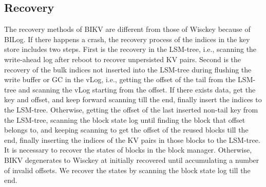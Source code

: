 \documentclass[sigconf]{acmart}
\begin{document}
\subsection{Recovery} \label{ss4}
%
The recovery methods of BIKV are different from those of Wisckey because of BILog. If there happens a crash, the recovery process of the indices in the key store includes two steps. First is the recovery in the LSM-tree, i.e., scanning the write-ahead log after reboot to recover unpersisted KV pairs. Second is the recovery of the bulk indices not inserted into the LSM-tree during flushing the write buffer or GC in the vLog, i.e., getting the offset of the tail from the LSM-tree and scanning the vLog starting from the offset. If there exists data, get the key and offset, and keep forward scanning till the end, finally insert the indices to the LSM-tree. Otherwise, getting the offset of the last inserted non-tail key from the LSM-tree, scanning the block state log until finding the block that offset belongs to, and keeping scanning to get the offset of the reused blocks till the end, finally inserting the indices of the KV pairs in those blocks to the LSM-tree. It is necessary to recover the states of blocks in the block manager. Otherwise, BIKV degenerates to Wisckey at initially recovered until accumulating a number of invalid offsets. We recover the states by scanning the block state log till the end.

\end{document}
